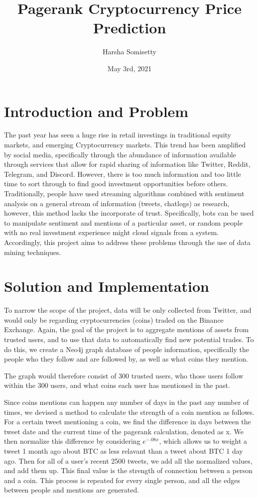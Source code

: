 \documentclass{article}
\title{Pagerank Cryptocurrency Price Prediction}
\author{Harsha Somisetty}
\date{May 3rd, 2021}
\begin{document}
\maketitle

\section{Introduction and Problem}


The past year has seen a huge rise in retail investings in traditional equity markets, and emerging Cryptocurrency markets. This trend has been amplified by social media, specifically through the abundance of information available through services that allow for rapid sharing of information like Twitter, Reddit, Telegram, and Discord. However, there is too much information and too little time to sort through to find good investment opportunities before others. Traditionally, people have used streaming algorithms combined with sentiment analysis on a general stream of information (tweets, chatlogs) as research, however, this method lacks the incorporate of trust. Specifically, bots can be used to manipulate sentiment and mentions of a particular asset, or random people with no real investment experience might cloud signals from a system. Accordingly, this project aims to address these problems through the use of data mining techniques.



\section{Solution and Implementation}

To narrow the scope of the project, data will be only collected from Twitter, and would only be regarding cryptocurrencies (coins) traded on the Binance Exchange. Again, the goal of the project is to aggregate mentions of assets from trusted users, and to use that data to automatically find new potential trades. To do this, we create a Neo4j graph database of people information, specifically the people who they follow and are followed by, as well as what coins they mention. 


The graph would therefore consist of 300 trusted users, who those users follow within the 300 users, and what coins each user has mentioned in the past. 


Since coins mentions can happen any number of days in the past any number of times, we devised a method to calculate the strength of a coin mention as follows. For a certain tweet mentioning a coin, we find the difference in days between the tweet date and the current time of the pagerank calculation, denoted as x. We then normalize this difference by considering $e^{-.08x}$, which allows us to weight a tweet 1 month ago about BTC as less relavant than a tweet about BTC 1 day ago. Then for all of a user's recent 2500 tweets, we add all the normalized values, and add them up. This final value is the strength of connection between a person and a coin. This process is repeated for every single person, and all the edges between people and mentions are generated.
\end{document}
